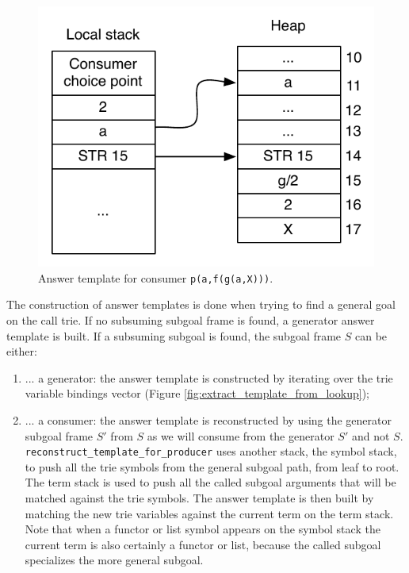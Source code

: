 \begin{figure}[ht]
  \centering
    \includegraphics[scale=0.6]{answer_template_consumer.pdf}
  \caption{Answer template for consumer \texttt{p(a,f(g(a,X)))}.}
  \label{fig:answer_template_consumer}
\end{figure}

The construction of answer templates is done when trying to find a general goal on the call trie.
If no subsuming subgoal frame is found, a generator answer template is built. If a subsuming subgoal
is found, the subgoal frame $S$ can be either:

\begin{enumerate}
  \item ... a generator: the answer template is constructed by iterating over the trie variable bindings vector (Figure \ref{fig:extract_template_from_lookup});
  \item ... a consumer: the answer template is reconstructed by using the generator subgoal frame $S'$ from $S$ as we will consume from the generator $S'$ and not $S$. \texttt{reconstruct\_template\_for\_producer} uses another stack, the symbol stack, to push all the trie symbols from the general subgoal path, from leaf to root. The term stack is used to push all the called subgoal arguments that will be matched against the trie symbols. The answer template is then built by matching the new trie variables against the current term on the term stack. Note that when a functor or list symbol appears on the symbol stack the current term is also certainly a functor or list, because the called subgoal specializes the more general subgoal.
\end{enumerate}

